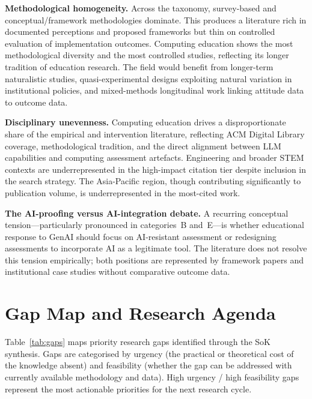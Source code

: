 \documentclass[conference]{IEEEtran}
\begin{document}
\textbf{Methodological homogeneity.}
Across the taxonomy, survey-based and conceptual/framework methodologies dominate. This produces a
literature rich in documented perceptions and proposed frameworks but thin on controlled evaluation
of implementation outcomes. Computing education shows the most methodological diversity and the most
controlled studies, reflecting its longer tradition of education research. The field would benefit from
longer-term naturalistic studies, quasi-experimental designs exploiting natural variation in institutional
policies, and mixed-methods longitudinal work linking attitude data to outcome data.

\textbf{Disciplinary unevenness.}
Computing education drives a disproportionate share of the empirical and intervention literature,
reflecting ACM Digital Library coverage, methodological tradition, and the direct alignment between LLM
capabilities and computing assessment artefacts. Engineering and broader STEM contexts are
underrepresented in the high-impact citation tier despite inclusion in the search strategy. The Asia-Pacific
region, though contributing significantly to publication volume, is underrepresented in the most-cited work.

\textbf{The AI-proofing versus AI-integration debate.}
A recurring conceptual tension---particularly pronounced in categories~B and~E---is whether educational
response to GenAI should focus on AI-resistant assessment or redesigning assessments to incorporate AI
as a legitimate tool. The literature does not resolve this tension empirically; both positions are
represented by framework papers and institutional case studies without comparative outcome data.

\section{Gap Map and Research Agenda}
\label{sec:gaps}

Table~\ref{tab:gaps} maps priority research gaps identified through the SoK synthesis. Gaps are
categorised by urgency (the practical or theoretical cost of the knowledge absent) and feasibility
(whether the gap can be addressed with currently available methodology and data). High
urgency / high feasibility gaps represent the most actionable priorities for the next research cycle.
\end{document}
